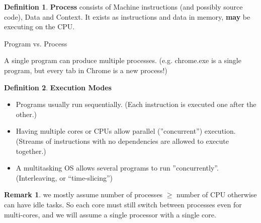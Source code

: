 \documentclass[12pt,a4paper]{article}
\theoremstyle{definition}
\newtheorem*{remark}{Remark}
\newtheorem{definition}{Definition}[section]
\newenvironment{myitemize}
{ \begin{itemize}
    \setlength{\itemsep}{5pt}
    \setlength{\parskip}{0pt}
    \setlength{\parsep}{0pt}     }
{ \end{itemize}                  }
\begin{document}
\begin{definition}{\textbf{Process}}
	consists of Machine instructions (and possibly source code), Data and Context. It exists as instructions and data in memory, \textbf{may} be executing on the CPU.
\end{definition}

\begin{tcolorbox}
	\textsf{Program vs. Process}
	
	A single program can produce multiple processes. (e.g. chrome.exe is a single program, but every tab in Chrome is a new process!)

\end{tcolorbox}

\begin{definition}{\textbf{Execution Modes}}
	\begin{myitemize}
		\item Programs usually run sequentially. (Each instruction is executed one after the other.)
		\item Having multiple cores or CPUs allow parallel (''concurrent'') execution. (Streams of instructions with no dependencies are allowed to execute together.)
		\item A multitasking OS allows several programs to run ''concurrently''. (Interleaving, or “time-slicing”)
	\end{myitemize}
\end{definition}

\begin{remark}
	we mostly assume number of processes $\geq$ number of CPU otherwise can have idle tasks. So each core must still switch between processes even for multi-cores, and we will assume a single processor with a single core.
\end{remark}
\end{document}
